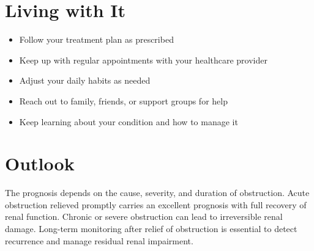 \section{Living with It}

\begin{itemize}[noitemsep]
  \item Follow your treatment plan as prescribed
  \item Keep up with regular appointments with your healthcare provider
  \item Adjust your daily habits as needed
  \item Reach out to family, friends, or support groups for help
  \item Keep learning about your condition and how to manage it
\end{itemize}

\section{Outlook}
The prognosis depends on the cause, severity, and duration of obstruction. Acute obstruction relieved promptly carries an excellent prognosis with full recovery of renal function. Chronic or severe obstruction can lead to irreversible renal damage. Long-term monitoring after relief of obstruction is essential to detect recurrence and manage residual renal impairment.
